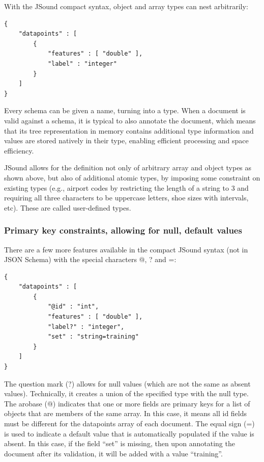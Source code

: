 With the JSound compact syntax, object and array types can nest arbitrarily:
\begin{lstlisting}[style=json]
{
    "datapoints" : [
        {
            "features" : [ "double" ],
            "label" : "integer"
        }
    ]
}
\end{lstlisting}

\vspace{1\baselineskip}

Every schema can be given a name, turning into a type. When a document is valid against a schema, it is typical to also annotate the document, which means that its tree representation in memory contains additional type information and values are stored natively in their type, enabling efficient processing and space efficiency.

JSound allows for the definition not only of arbitrary array and object types as shown above, but also of additional atomic types, by imposing some constraint on existing types (e.g., airport codes by restricting the length of a string to 3 and requiring all three characters to be uppercase letters, shoe sizes with intervals, etc). These are called user-defined types.

\subsubsection{Primary key constraints, allowing for null, default values}
There are a few more features available in the compact JSound syntax (not in JSON Schema) with the special characters @, ? and =:

\begin{lstlisting}[style=json]
{
    "datapoints" : [
        {
            "@id" : "int",
            "features" : [ "double" ],
            "label?" : "integer",
            "set" : "string=training"
        } 
    ]
}
\end{lstlisting}
The question mark (?) allows for null values (which are not the same as absent values). Technically, it creates a union of the specified type with the null type.
The arobase (@) indicates that one or more fields are primary keys for a list of objects that are members of the same array. In this case, it means all id fields must be different for the datapoints array of each document.
The equal sign (=) is used to indicate a default value that is automatically populated if the value is absent. In this case, if the field “set” is missing, then upon annotating the document after its validation, it will be added with a value “training”.

